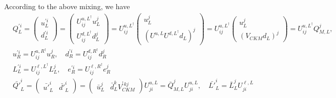 \documentclass[12pt]{article}
\begin{document}
According to the above mixing, we have
\begin{align}
&Q_{L}^{'i} = \begin{pmatrix}
u_{L}^{'i} \\
d_{L}^{'i}
\end{pmatrix} = \begin{pmatrix}
U_{ij}^{u,L^{\dagger}}u_{L}^{j} \\
U_{ij}^{d,L^{\dagger}}d_{L}^{j}
\end{pmatrix} = U_{ij}^{u,L^{\dagger}}\begin{pmatrix}
u_{L}^{j} \\
(U^{u,L}U^{d,L^{\dagger}}d_{L})^{j}
\end{pmatrix}=U_{ij}^{u,L^{\dagger}}\begin{pmatrix}
u_{L}^{j} \\
(V_{CKM}d_{L})^{j}
\end{pmatrix} = U_{ij}^{u,L^{\dagger}}Q_{M,L}^{j},\\
& u_{R}^{'i} = U_{ij}^{u,R^{\dagger}}u_{R}^{j},\quad d_{R}^{'i}= U_{ij}^{d,R^{\dagger}}d_{R}^{j} \\
& L_{L}^{'i} = U_{ij}^{\ell,L^{\dagger}}L_{L}^{j}, \quad e_{R}^{'i} = U_{ij}^{\ell,R^{\dagger}}e_{R}^{j}
\end{align}
\begin{align}
\bar{Q'}_{L}^{i} = \begin{pmatrix}
\bar{u'}_{L}^{i} & \bar{d'}_{L}^{i}
\end{pmatrix} = \begin{pmatrix}
\bar{u}_{L}^{j} & \bar{d}_{L}^{k}V_{CKM}^{^{\dagger} kj}
\end{pmatrix}U_{ji}^{u,L} = \bar{Q}_{M,L}^{j}U_{ji}^{u,L}, \quad \bar{L'}_{L}^{i} = \bar{L}_{L}^{j}U^{\ell,L}_{ji}
\end{align}
\end{document}
